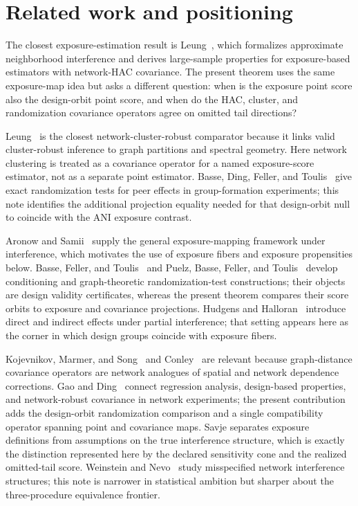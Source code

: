 \documentclass[11pt]{article}
\theoremstyle{definition}
\theoremstyle{plain}
\theoremstyle{remark}
\begin{document}
\section{Related work and positioning}
The closest exposure-estimation result is Leung~\cite{Leung2022ANI}, which
formalizes approximate neighborhood interference and derives large-sample
properties for exposure-based estimators with network-HAC covariance.  The
present theorem uses the same exposure-map idea but asks a different question:
when is the exposure point score also the design-orbit point score, and when
do the HAC, cluster, and randomization covariance operators agree on omitted
tail directions?

Leung~\cite{Leung2023NCRI} is the closest network-cluster-robust comparator
because it links valid cluster-robust inference to graph partitions and
spectral geometry.  Here network clustering is treated as a covariance
operator for a named exposure-score estimator, not as a separate point
estimator.  Basse, Ding, Feller, and Toulis~\cite{BasseDingFellerToulis2024}
give exact randomization tests for peer effects in group-formation
experiments; this note identifies the additional projection equality needed
for that design-orbit null to coincide with the ANI exposure contrast.

Aronow and Samii~\cite{AronowSamii2017Exposure} supply the general
exposure-mapping framework under interference, which motivates the use of
exposure fibers and exposure propensities below.  Basse, Feller, and
Toulis~\cite{BasseFellerToulis2019} and Puelz, Basse, Feller, and
Toulis~\cite{PuelzBasseFellerToulis2022} develop conditioning and
graph-theoretic randomization-test constructions; their objects are design
validity certificates, whereas the present theorem compares their score
orbits to exposure and covariance projections.  Hudgens and
Halloran~\cite{HudgensHalloran2008} introduce direct and indirect effects
under partial interference; that setting appears here as the corner in which
design groups coincide with exposure fibers.

Kojevnikov, Marmer, and Song~\cite{KojevnikovMarmerSong2021} and
Conley~\cite{Conley1999Spatial} are relevant because graph-distance covariance
operators are network analogues of spatial and network dependence corrections.
Gao and Ding~\cite{GaoDing2025Network} connect regression analysis,
design-based properties, and network-robust covariance in network experiments;
the present contribution adds the design-orbit randomization comparison and a
single compatibility operator spanning point and covariance maps.  Savje
\cite{Savje2024MisspecifiedExposure} separates exposure definitions from
assumptions on the true interference structure, which is exactly the
distinction represented here by the declared sensitivity cone and the
realized omitted-tail score.  Weinstein and Nevo~\cite{WeinsteinNevo2026}
study misspecified network interference structures; this note is narrower in
statistical ambition but sharper about the three-procedure equivalence
frontier.
\end{document}
